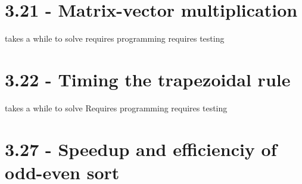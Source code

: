 \documentclass[a4paper,11pt,twoside]{article}
\begin{document}
\section{3.21 - Matrix-vector multiplication}
takes a while to solve
requires programming
requires testing

\section{3.22 - Timing the trapezoidal rule}
takes a while to solve
Requires programming
requires testing

\section{3.27 - Speedup and efficienciy of odd-even sort}



\end{document}
